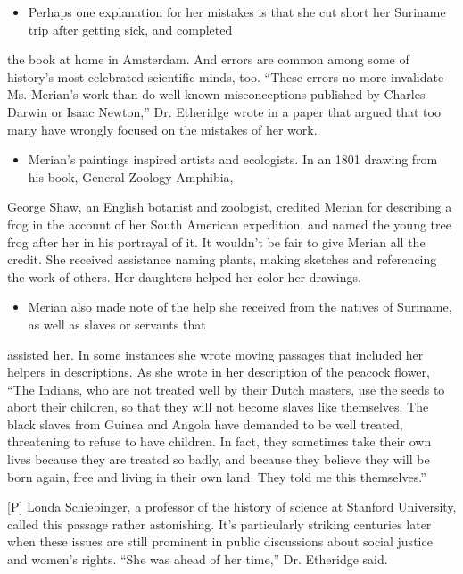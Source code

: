 \documentclass[UTF8,11pt]{ctexart}
\begin{document}
\begin{itemize}[leftmargin=2em,itemsep=.2em,topsep=.4em]\item[M.] Perhaps one explanation for her mistakes is that she cut short her Suriname trip after getting sick, and completed
\end{itemize}

the book at home in Amsterdam. And errors are common among some of history's most-celebrated scientific minds, too. “These errors no more invalidate Ms. Merian's work than do well-known misconceptions published by Charles Darwin or Isaac Newton,” Dr. Etheridge wrote in a paper that argued that too many have wrongly focused on the mistakes of her work.


\begin{itemize}[leftmargin=2em,itemsep=.2em,topsep=.4em]\item[N.] Merian’s paintings inspired artists and ecologists. In an 1801 drawing from his book, General Zoology Amphibia,
\end{itemize}

George Shaw, an English botanist and zoologist, credited Merian for describing a frog in the account of her South American expedition, and named the young tree frog after her in his portrayal of it. It wouldn't be fair to give Merian all the credit. She received assistance naming plants, making sketches and referencing the work of others. Her daughters helped her color her drawings.


\begin{itemize}[leftmargin=2em,itemsep=.2em,topsep=.4em]\item[O.] Merian also made note of the help she received from the natives of Suriname, as well as slaves or servants that
\end{itemize}

assisted her. In some instances she wrote moving passages that included her helpers in descriptions. As she wrote in her description of the peacock flower, “The Indians, who are not treated well by their Dutch masters, use the seeds to abort their children, so that they will not become slaves like themselves. The black slaves from Guinea and Angola have demanded to be well treated, threatening to refuse to have children. In fact, they sometimes take their own lives because they are treated so badly, and because they believe they will be born again, free and living in their own land. They told me this themselves.”


[P] Londa Schiebinger, a professor of the history of science at Stanford University, called this passage rather astonishing. It's particularly striking centuries later when these issues are still prominent in public discussions about social justice and women’s rights. “She was ahead of her time,” Dr. Etheridge said.
\end{document}
